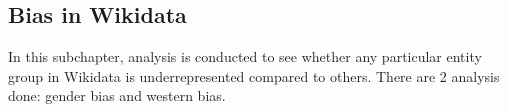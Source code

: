 \subsection{Bias in Wikidata}

In this subchapter, analysis is conducted to see whether any particular entity group in Wikidata is underrepresented compared to others. There are 2 analysis done: gender bias and western bias.



